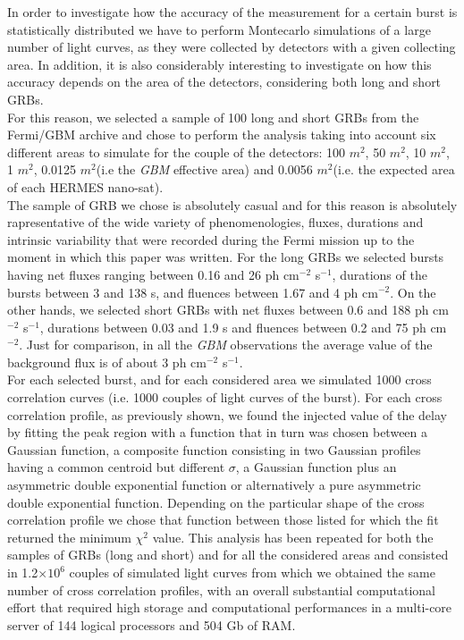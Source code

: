 \documentclass[]{spie}  %
\def \gbm{\textit{GBM}\xspace}
\def \mq{$m^{2}$\xspace}
\begin{document}
In order to investigate how the accuracy of the measurement for a certain burst is statistically distributed we have to perform Montecarlo simulations of a large number of light curves, as they were collected by detectors with a given collecting area. In addition, it is also considerably interesting to investigate on how this accuracy depends on the area of the detectors, considering both long and short GRBs. \\
For this reason, we selected a sample of 100 long and short GRBs from the Fermi/GBM archive and chose to perform the analysis taking into account six different areas to simulate for the couple of the detectors: 100 \mq, 50 \mq, 10 \mq, 1 \mq, 0.0125 \mq (i.e the \gbm effective area) and 0.0056 \mq (i.e. the expected area of each HERMES nano-sat). \\
The sample of GRB we chose is absolutely casual and for this reason is absolutely rapresentative of the wide variety of phenomenologies, fluxes, durations and intrinsic variability that were recorded during the Fermi mission up to the moment in which this paper was written. For the long GRBs we selected bursts having net fluxes ranging between 0.16 and 26 ph cm$^{-2}$ s$^{-1}$, durations of the bursts between 3 and 138 s, and fluences between 1.67 and 4 ph cm$^{-2}$. On the other hands, we selected short GRBs with net fluxes between 0.6 and 188 ph cm$^{-2}$ s$^{-1}$, durations between 0.03 and 1.9 s and fluences between 0.2 and 75 ph cm$^{-2}$. Just for comparison, in all the \gbm observations the average value of the background flux is of about 3 ph cm$^{-2}$ s$^{-1}$.\\
For each selected burst, and for each considered area we simulated 1000 cross correlation curves (i.e. 1000 couples of light curves of the burst). For each cross correlation profile, as previously shown, we found the injected value of the delay by fitting the peak region with a function that in turn was chosen between a Gaussian function, a composite function consisting in two Gaussian profiles having a common centroid but different $\sigma$, a Gaussian function plus an asymmetric double exponential function or alternatively a pure asymmetric double exponential function. Depending on the particular shape of the cross correlation profile we chose that function between those listed for which the fit returned the minimum $\chi^{2}$ value. This analysis has been repeated for both the samples of GRBs (long and short) and for all the considered areas and consisted in 1.2$\times10^{6}$ couples of simulated light curves from which we obtained the same number of cross correlation profiles, with an overall substantial computational effort that required high storage and computational performances in a multi-core server of 144 logical processors and 504 Gb of RAM.
\end{document}
